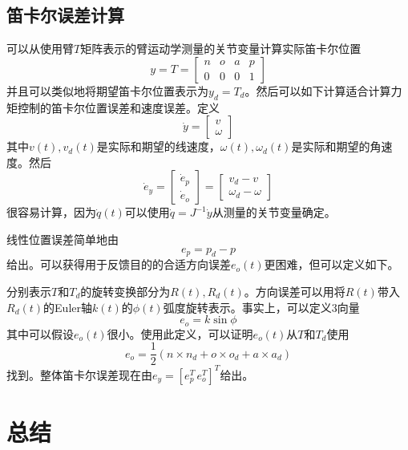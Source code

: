 \documentclass[UTF8]{ctexart}
\theoremstyle{definition}
\begin{document}
\subsection{笛卡尔误差计算}

可以从使用臂$T$矩阵表示的臂运动学测量的关节变量计算实际笛卡尔位置
\begin{equation}
    y = T = \begin{bmatrix} n & o & a & p \\ 0 & 0 & 0 & 1 \end{bmatrix}
\end{equation}
并且可以类似地将期望笛卡尔位置表示为$y_d = T_d$。然后可以如下计算适合计算力矩控制的笛卡尔位置误差和速度误差。定义
\begin{equation}
    \dot{y} = \begin{bmatrix} v \\ \omega \end{bmatrix}
\end{equation}
其中$v(t), v_d(t)$是实际和期望的线速度，$\omega(t), \omega_d(t)$是实际和期望的角速度。然后
\begin{equation}
    \dot{e}_y = \begin{bmatrix} \dot{e}_p \\ \dot{e}_o \end{bmatrix} = \begin{bmatrix} v_d - v \\ \omega_d - \omega \end{bmatrix}
\end{equation}
很容易计算，因为$\dot{q}(t)$可以使用$\dot{q} = J^{-1}\dot{y}$从测量的关节变量确定。

线性位置误差简单地由
\begin{equation}
    e_p = p_d - p
\end{equation}
给出。可以获得用于反馈目的的合适方向误差$e_o(t)$更困难，但可以定义如下。

分别表示$T$和$T_d$的旋转变换部分为$R(t), R_d(t)$。方向误差可以用将$R(t)$带入$R_d(t)$的Euler轴$k(t)$的$\phi(t)$弧度旋转表示。事实上，可以定义3向量
\begin{equation}
    e_o = k\sin\phi
\end{equation}
其中可以假设$e_o(t)$很小。使用此定义，可以证明$e_o(t)$从$T$和$T_d$使用
\begin{equation}
    e_o = \frac{1}{2}(n \times n_d + o \times o_d + a \times a_d)
\end{equation}
找到。整体笛卡尔误差现在由$e_y = [e_p^T \, e_o^T]^T$给出。

\section{总结}
\end{document}
